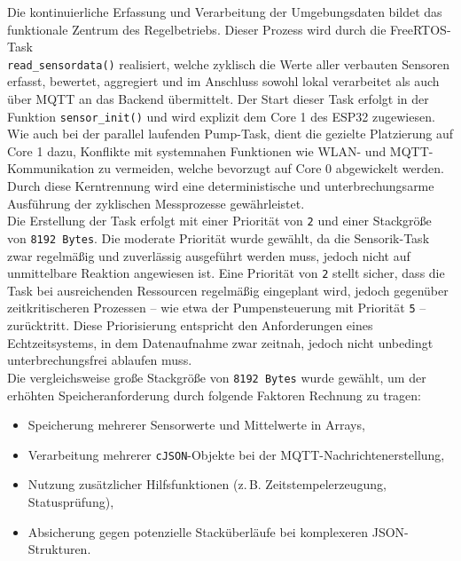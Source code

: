 Die kontinuierliche Erfassung und Verarbeitung der Umgebungsdaten bildet das funktionale Zentrum des Regelbetriebs. Dieser Prozess wird durch die FreeRTOS-Task \\
\texttt{read\_sensordata()} realisiert, welche zyklisch die Werte aller verbauten Sensoren erfasst, bewertet, aggregiert und im Anschluss sowohl lokal verarbeitet als auch über MQTT an das Backend übermittelt. Der Start dieser Task erfolgt in der Funktion \texttt{sensor\_init()} und wird explizit dem Core 1 des ESP32 zugewiesen.
\\
Wie auch bei der parallel laufenden Pump-Task, dient die gezielte Platzierung auf Core 1 dazu, Konflikte mit systemnahen Funktionen wie WLAN- und MQTT-Kommunikation zu vermeiden, welche bevorzugt auf Core 0 abgewickelt werden. Durch diese Kerntrennung wird eine deterministische und unterbrechungsarme Ausführung der zyklischen Messprozesse gewährleistet.
\\
Die Erstellung der Task erfolgt mit einer Priorität von \texttt{2} und einer Stackgröße von \texttt{8192 Bytes}. Die moderate Priorität wurde gewählt, da die Sensorik-Task zwar regelmäßig und zuverlässig ausgeführt werden muss, jedoch nicht auf unmittelbare Reaktion angewiesen ist. Eine Priorität von \texttt{2} stellt sicher, dass die Task bei ausreichenden Ressourcen regelmäßig eingeplant wird, jedoch gegenüber zeitkritischeren Prozessen – wie etwa der Pumpensteuerung mit Priorität \texttt{5} – zurücktritt. Diese Priorisierung entspricht den Anforderungen eines Echtzeitsystems, in dem Datenaufnahme zwar zeitnah, jedoch nicht unbedingt unterbrechungsfrei ablaufen muss.
\\
Die vergleichsweise große Stackgröße von \texttt{8192 Bytes} wurde gewählt, um der erhöhten Speicheranforderung durch folgende Faktoren Rechnung zu tragen:
\\
\begin{itemize}
	\item Speicherung mehrerer Sensorwerte und Mittelwerte in Arrays,
	\item Verarbeitung mehrerer \texttt{cJSON}-Objekte bei der MQTT-Nachrichtenerstellung,
	\item Nutzung zusätzlicher Hilfsfunktionen (z.\,B. Zeitstempelerzeugung, Statusprüfung),
	\item Absicherung gegen potenzielle Stacküberläufe bei komplexeren JSON-Strukturen.
\end{itemize}

\vspace{1em}

